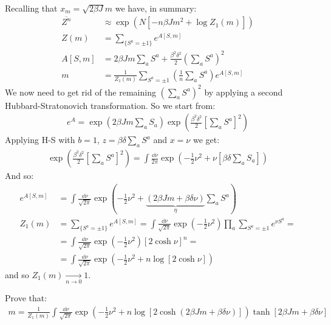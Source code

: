 \documentclass[../template.tex]{subfiles}
\begin{document}
Recalling that $x_m = \sqrt{2 \beta J}m$ we have, in summary:
\begin{align*}
    \overline{Z^n} &\approx \exp\left(N [-n \beta J m^2 + \log Z_1(m)]\right)\\
    Z(m) &= \sum_{\{S^a = \pm 1\}} e^{A[S,m]}\\
    A[S,m] &= 2 \beta J m \sum_a S^a + \frac{\beta^2 \delta^2}{2} \left(\sum_a S^a\right)^2 \\
    m &= \frac{1}{Z_1(m)} \sum_{S^a = \pm 1} \left(\frac{1}{n} \sum_a S^a \right) e^{A[S,m]}  
\end{align*} 
We now need to get rid of the remaining $(\sum_a S^a)^2$ by applying a second Hubbard-Stratonovich transformation. So we start from:
\begin{align*}
    e^A = \exp\left(2 \beta Jm \sum_a S_a\right) \exp\left(\frac{\beta^2 \delta^2}{2} \left[\sum_a S^a\right]^2 \right)
\end{align*}
Applying H-S with $b=1$, $z = \beta \delta \sum_a S^a$ and $x = \nu$ we get:
\begin{align*}
    \exp\left(\frac{\beta^2 \delta^2}{2} \left[\sum_a S^a\right]^2 \right) = \int \frac{\dd{\nu}}{2 \pi} \exp\left(-\frac{1}{2} \nu^2 + \nu \left[\beta \delta \sum_a S_a\right] \right)
\end{align*}   
And so:
\begin{align*}
    e^{A[S,m]} &= \int \frac{\dd{\nu}}{\sqrt{2 \pi}} \exp\left(-\frac{1}{2} \nu^2 + \underbrace{(2 \beta J m + \beta \delta \nu)}_{\eta} \sum_a S^a  \right)\\
    Z_1(m) &= \sum_{\{S^a = \pm 1\}} e^{A[S,m]} = \int \frac{\dd{\nu}}{\sqrt{2 \pi}} \exp\left(-\frac{1}{2} \nu^2 \right) \prod_a \sum_{S^a = \pm 1} e^{\nu S^a} =\\
    &= \int \frac{\dd{\nu}}{\sqrt{2 \pi}} \exp\left(-\frac{1}{2} \nu^2 \right) [2 \cosh \nu]^n = \\
    &= \int \frac{\dd{\nu}}{\sqrt{2\pi}} \exp\left(-\frac{1}{2} \nu^2 + n \log [2 \cosh \nu] \right) 
\end{align*} 
and so $Z_1 (m)  \xrightarrow[n \to 0]{}  1$. 

\begin{exo}[Magnetization]
    Prove that:
    \begin{align*}
        m = \frac{1}{Z_1(m)} \int \frac{\dd{\nu}}{\sqrt{2\pi}} \exp\left(-\frac{1}{2} \nu^2 + n \log [2 \cosh (2 \beta J m + \beta \delta \nu)] \right)  \tanh [2 \beta J m + \beta \delta \nu]
    \end{align*}
    
\end{exo}
\end{document}
